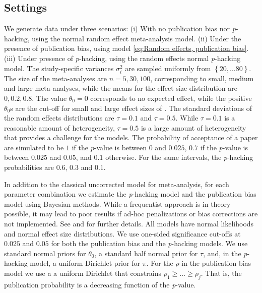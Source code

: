 \documentclass[useAMS,usenatbib,referee]{biom}
\begin{document}
\subsection{Settings}
We generate data under three scenarios: (i) With no publication bias nor \textit{p}-hacking, using the normal random effect meta-analysis model. (ii) Under the presence of publication bias, using model \eqref{eq:Random effects, publication bias}. (iii) Under presence of \textit{p}-hacking, using the random effects normal \textit{p}-hacking model. The study-specific variances $\sigma_{i}^{2}$ are sampled uniformly from $\left\{ 20,\ldots80\right\} $. The size of the meta-analyses are $n = 5, 30, 100$, corresponding to small, medium and large meta-analyses, while the means for the effect size distribution are $0, 0.2, 0.8$. The value $\theta_0 = 0$ corresponds to no expected effect, while the positive $\theta_0$s are the cut-off for small and large effect sizes of \citet[][pages 24 -- 27]{cohen1988statistical}. The standard deviations of the random effects distributions are $\tau=0.1$ and $\tau=0.5$. While $\tau = 0.1$ is a reasonable amount of heterogeneity, $\tau=0.5$ is a large amount of heterogeneity that provides a challenge for the models. The probability of acceptance of a paper are simulated to be $1$ if the \textit{p}-value is between $0$ and $0.025$, $0.7$ if the \textit{p}-value is between $0.025$ and $0.05$, and $0.1$ otherwise. For the same intervals, the \textit{p}-hacking probabilities are $0.6$, $0.3$ and $0.1$. 

In addition to the classical uncorrected model for meta-analysis, for each parameter combination we estimate the \textit{p}-hacking model and the publication bias model using Bayesian methods. While a frequentist approach is in theory possible, it may lead to poor results if ad-hoc penalizations or bias corrections are not implemented. See  \citet[Appendix, 1]{mcshane2016adjusting} and \citet{Moss2019} for further details. All models have normal likelihoods and normal effect size distributions. We use one-sided significance cut-offs at $0.025$ and $0.05$ for both the publication bias and the \textit{p}-hacking models. We use standard normal priors for $\theta_0$, a standard half normal prior for $\tau$, and, in the \textit{p}-hacking model, a uniform Dirichlet prior for $\pi$. For the $\rho$ in the publication bias model we use a a uniform Dirichlet that constrains $\rho_{1}\geq\ldots\geq\rho_{j}$. That is, the publication probability is a decreasing function of the \textit{p}-value.
\end{document}
